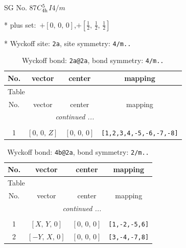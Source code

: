 \documentclass[fleqn,8pt]{jsarticle}
\begin{document}
\setcounter{MaxMatrixCols}{32}

\renewcommand{\tablename}{Table~}
\renewcommand{\figurename}{Figure~}
\begin{center}
\LARGE
SG No. 87\quad$C_{\rm 4h}^{5}$\quad$I4/m$\quad[ tetragonal ]
\end{center}

* plus set:\,\,\,$+\left[ 0,\, 0,\, 0 \right]$,\quad $+\left[ \frac{1}{2},\, \frac{1}{2},\, \frac{1}{2} \right]$


* Wyckoff site: {\tt 2a}, site symmetry: {\tt 4/m..}
\renewcommand{\arraystretch}{1.2}
\begin{longtable}{cccc}
\caption{Wyckoff bond: {\tt 2a@2a}, bond symmetry: {\tt 4/m..}}
 \\
 \hline \hline
No. & vector & center & mapping \\ \hline \endfirsthead

\multicolumn{3}{l}{\tablename\ \thetable{}} \\
 \hline \hline
No. & vector & center & mapping \\ \hline \endhead

 \hline \hline
\multicolumn{3}{r}{\footnotesize\it continued ...} \\ \endfoot

 \hline \hline
\multicolumn{3}{r}{} \\ \endlastfoot

1 & $\left[ 0,\, 0,\, Z \right]$ & $\left[ 0,\, 0,\, 0 \right]$ & {\tt [1,2,3,4,-5,-6,-7,-8]} \\
\end{longtable}
\renewcommand{\arraystretch}{1.2}
\begin{longtable}{cccc}
\caption{Wyckoff bond: {\tt 4b@2a}, bond symmetry: {\tt 2/m..}}
 \\
 \hline \hline
No. & vector & center & mapping \\ \hline \endfirsthead

\multicolumn{3}{l}{\tablename\ \thetable{}} \\
 \hline \hline
No. & vector & center & mapping \\ \hline \endhead

 \hline \hline
\multicolumn{3}{r}{\footnotesize\it continued ...} \\ \endfoot

 \hline \hline
\multicolumn{3}{r}{} \\ \endlastfoot

1 & $\left[ X,\, Y,\, 0 \right]$ & $\left[ 0,\, 0,\, 0 \right]$ & {\tt [1,-2,-5,6]} \\ \hline
2 & $\left[ - Y,\, X,\, 0 \right]$ & $\left[ 0,\, 0,\, 0 \right]$ & {\tt [3,-4,-7,8]} \\
\end{longtable}
\end{document}
